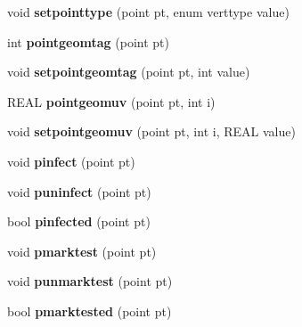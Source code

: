 \begin{DoxyCompactItemize}
\item 
\hypertarget{classtetgenmesh_a036752e66b8fcce81d7f983842fcf8d3}{void {\bfseries setpointtype} (point pt, enum verttype value)}\label{classtetgenmesh_a036752e66b8fcce81d7f983842fcf8d3}

\item 
\hypertarget{classtetgenmesh_a5f3d4b9b05181247bc518d6c0b0ac790}{int {\bfseries pointgeomtag} (point pt)}\label{classtetgenmesh_a5f3d4b9b05181247bc518d6c0b0ac790}

\item 
\hypertarget{classtetgenmesh_ae61f5def2617ad2cedf2bbc5f6a59c02}{void {\bfseries setpointgeomtag} (point pt, int value)}\label{classtetgenmesh_ae61f5def2617ad2cedf2bbc5f6a59c02}

\item 
\hypertarget{classtetgenmesh_ad9b42ae25336d5ecb21577fe072a54a0}{R\-E\-A\-L {\bfseries pointgeomuv} (point pt, int i)}\label{classtetgenmesh_ad9b42ae25336d5ecb21577fe072a54a0}

\item 
\hypertarget{classtetgenmesh_a9bf2266e82ad2f2faf77f6b502e8ba1d}{void {\bfseries setpointgeomuv} (point pt, int i, R\-E\-A\-L value)}\label{classtetgenmesh_a9bf2266e82ad2f2faf77f6b502e8ba1d}

\item 
\hypertarget{classtetgenmesh_a3da09b1723336c0d9e82677f8f30c965}{void {\bfseries pinfect} (point pt)}\label{classtetgenmesh_a3da09b1723336c0d9e82677f8f30c965}

\item 
\hypertarget{classtetgenmesh_a6220e341248cd83ab6ee1c0d71e4d160}{void {\bfseries puninfect} (point pt)}\label{classtetgenmesh_a6220e341248cd83ab6ee1c0d71e4d160}

\item 
\hypertarget{classtetgenmesh_acc0db186d69dcdf785b49d6e709fed7b}{bool {\bfseries pinfected} (point pt)}\label{classtetgenmesh_acc0db186d69dcdf785b49d6e709fed7b}

\item 
\hypertarget{classtetgenmesh_a7f5f5b3321dcc8cb4f7852fd63688043}{void {\bfseries pmarktest} (point pt)}\label{classtetgenmesh_a7f5f5b3321dcc8cb4f7852fd63688043}

\item 
\hypertarget{classtetgenmesh_af01c7d8e906de52fb5e8622d5a8dfb15}{void {\bfseries punmarktest} (point pt)}\label{classtetgenmesh_af01c7d8e906de52fb5e8622d5a8dfb15}

\item 
\hypertarget{classtetgenmesh_ae775251add4fdb4ccf446ff12d602de9}{bool {\bfseries pmarktested} (point pt)}\label{classtetgenmesh_ae775251add4fdb4ccf446ff12d602de9}


\end{DoxyCompactItemize}

